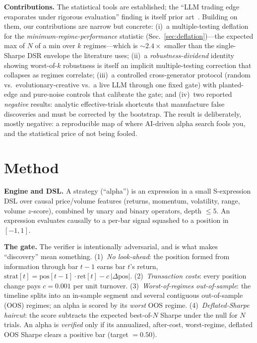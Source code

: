 \documentclass[sigconf,review,anonymous]{acmart}
\begin{document}
\textbf{Contributions.} The statistical tools are established; the ``LLM trading edge evaporates under rigorous evaluation'' finding is itself prior art~\cite{finsaber2026}. Building on them, our contributions are narrow but concrete: (i)~a multiple-testing deflation for the \emph{minimum-regime-performance} statistic (Sec.~\ref{sec:deflation})---the expected max of $N$ of a min over $k$ regimes---which is ${\sim}2.4\times$ smaller than the single-Sharpe DSR envelope the literature uses; (ii)~a \emph{robustness-dividend} identity showing worst-of-$k$ robustness is itself an implicit multiple-testing correction that collapses as regimes correlate; (iii)~a controlled cross-generator protocol (random vs.\ evolutionary-creative vs.\ a live LLM through one fixed gate) with planted-edge and pure-noise controls that calibrate the gate; and (iv)~two reported \emph{negative} results: analytic effective-trials shortcuts that manufacture false discoveries and must be corrected by the bootstrap. The result is deliberately, mostly negative: a reproducible map of where AI-driven alpha search fools you, and the statistical price of not being fooled.

\section{Method}
\textbf{Engine and DSL.} A strategy (``alpha'') is an expression in a small S-expression DSL over causal price/volume features (returns, momentum, volatility, range, volume $z$-score), combined by unary and binary operators, depth $\le 5$. An expression evaluates causally to a per-bar signal squashed to a position in $[-1,1]$.

\textbf{The gate.} The verifier is intentionally adversarial, and is what makes ``discovery'' mean something. (1)~\emph{No look-ahead}: the position formed from information through bar $t{-}1$ earns bar $t$'s return, $\text{strat}[t]=\text{pos}[t{-}1]\cdot\text{ret}[t]-c\,|\Delta\text{pos}|$. (2)~\emph{Transaction costs}: every position change pays $c=0.001$ per unit turnover. (3)~\emph{Worst-of-regimes out-of-sample}: the timeline splits into an in-sample segment and several contiguous out-of-sample (OOS) regimes; an alpha is scored by its \emph{worst} OOS regime. (4)~\emph{Deflated-Sharpe haircut}: the score subtracts the expected best-of-$N$ Sharpe under the null for $N$ trials. An alpha is \emph{verified} only if its annualized, after-cost, worst-regime, deflated OOS Sharpe clears a positive bar (target $=0.50$).
\end{document}
